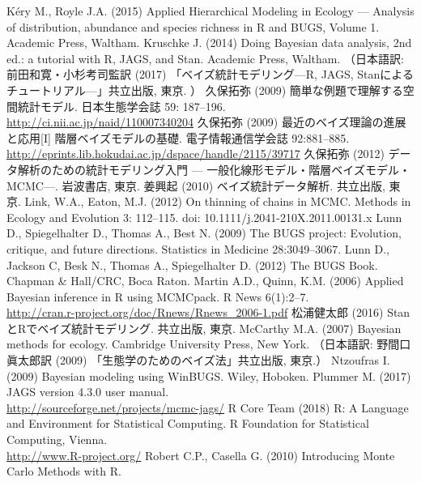\documentclass[11pt,uplatex]{jsarticle}
\begin{document}
\begin{thebibliography}{99}
 K\'ery M., Royle J.A. (2015) Applied Hierarchical Modeling in Ecology --- Analysis of distribution, abundance and species richness in R and BUGS, Volume 1. Academic Press, Waltham.
 Kruschke J. (2014) Doing Bayesian data analysis, 2nd ed.:
  a tutorial with R, JAGS, and Stan. Academic Press, Waltham.
  （日本語訳: 前田和寛・小杉考司監訳 (2017) 「ベイズ統計モデリング---R, JAGS, Stanによるチュートリアル---」共立出版, 東京. ）
 久保拓弥 (2009) 簡単な例題で理解する空間統計モデル. 
  日本生態学会誌 59: 187--196. \\
  \url{http://ci.nii.ac.jp/naid/110007340204}
 久保拓弥 (2009) 最近のベイズ理論の進展と応用[I]
  階層ベイズモデルの基礎. 電子情報通信学会誌 92:881--885.\\
  \url{http://eprints.lib.hokudai.ac.jp/dspace/handle/2115/39717}
 久保拓弥 (2012) データ解析のための統計モデリング入門 ---
   一般化線形モデル・階層ベイズモデル・MCMC---. 岩波書店, 東京.
 姜興起 (2010) ベイズ統計データ解析. 共立出版, 東京.
 Link, W.A., Eaton, M.J. (2012) On thinning of chains in MCMC.
Methods in Ecology and Evolution 3: 112--115. doi: 10.1111/j.2041-210X.2011.00131.x
 Lunn D., Spiegelhalter D., Thomas A., Best N. (2009)
  {The BUGS project: Evolution, critique, and future directions}.
  {Statistics in Medicine} {28}:3049--3067.
 Lunn D., Jackson C, Besk N., Thomas A., Spiegelhalter D.
  (2012) The {BUGS} Book. Chapman \& Hall/CRC, Boca Raton.
 Martin A.D., Quinn, K.M. (2006) Applied Bayesian inference in R
using MCMCpack. R News 6(1):2--7. \\
    \url{http://cran.r-project.org/doc/Rnews/Rnews_2006-1.pdf}
 松浦健太郎 (2016) StanとRでベイズ統計モデリング. 共立出版, 東京.
 McCarthy M.A. (2007) Bayesian methods for ecology.
  Cambridge University Press, New York.
  （日本語訳: 野間口眞太郎訳 (2009) 「生態学のためのベイズ法」共立出版, 東京.）
 Ntzoufras I. (2009) Bayesian modeling using WinBUGS.
  Wiley, Hoboken.
 Plummer M. (2017) JAGS version 4.3.0 user manual.\\
  \url{http://sourceforge.net/projects/mcmc-jags/}
 R Core Team (2018)
   R: A Language and Environment for Statistical Computing.
   R Foundation for Statistical Computing, Vienna.\\
   \url{http://www.R-project.org/}
 Robert C.P., Casella G. (2010) Introducing Monte Carlo Methods with R.

\end{thebibliography}
\end{document}
